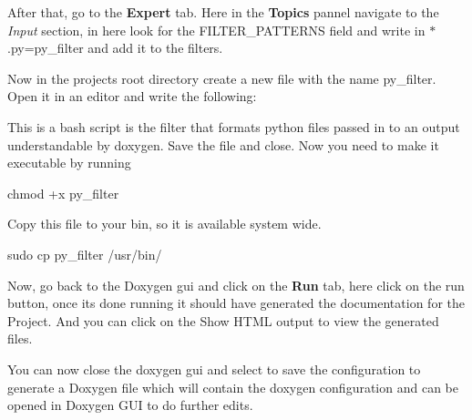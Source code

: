 After that, go to the {\bfseries Expert} tab. Here in the {\bfseries Topics} pannel navigate to the {\itshape Input} section, in here look for the {\ttfamily F\+I\+L\+T\+E\+R\+\_\+\+P\+A\+T\+T\+E\+R\+NS} field and write in {\ttfamily $\ast$.py=py\+\_\+filter} and add it to the filters.

Now in the projects root directory create a new file with the name {\ttfamily py\+\_\+filter}. Open it in an editor and write the following\+: 
 This is a bash script is the filter that formats python files passed in to an output understandable by doxygen. Save the file and close. Now you need to make it executable by running 
\begin{DoxyCode}
chmod +x py\_filter
\end{DoxyCode}
 Copy this file to your bin, so it is available system wide. 
\begin{DoxyCode}
sudo cp py\_filter /usr/bin/
\end{DoxyCode}


Now, go back to the Doxygen gui and click on the {\bfseries Run} tab, here click on the run button, once its done running it should have generated the documentation for the Project. And you can click on the Show H\+T\+ML output to view the generated files.

You can now close the doxygen gui and select to save the configuration to generate a {\ttfamily Doxygen} file which will contain the doxygen configuration and can be opened in Doxygen G\+UI to do further edits. 